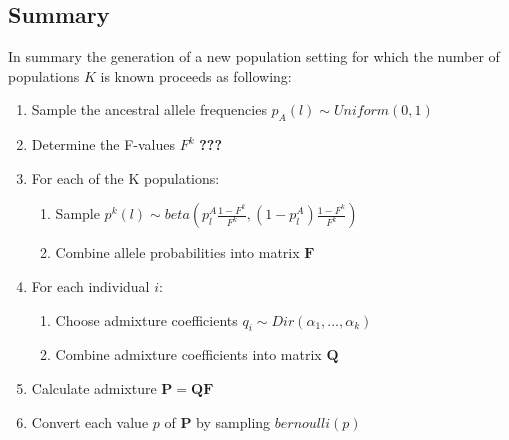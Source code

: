 \documentclass[a4paper, 11pt]{article}
\begin{document}
\subsection{Summary}
In summary the generation of a new population setting for which the number of populations $K$ is known proceeds as following:
\begin{enumerate}
\item Sample the ancestral allele frequencies $p_A(l) \sim Uniform(0, 1)$
\item Determine the F-values $F^k$ \textbf{???}
\item  For each of the K populations:
\begin{enumerate}
\item Sample $p^k(l) \sim beta(p^{A}_{l} \frac{1 - F^k}{F^k}, (1-p^{A}_{l}) \frac{1 - F^k}{F^k})$
\item Combine allele probabilities into matrix $\mathbf{F}$
\end{enumerate} 
\item For each individual $i$:
\begin{enumerate}
\item Choose admixture coefficients $q_i \sim Dir(\alpha_1, \ldots, \alpha_k)$
\item Combine admixture coefficients into matrix $\mathbf{Q}$
\end{enumerate}
\item Calculate admixture $\mathbf{P} = \mathbf{Q}\mathbf{F}$
\item Convert each value $p$ of $\mathbf{P}$ by sampling $bernoulli(p)$
\end{enumerate}
\end{document}
